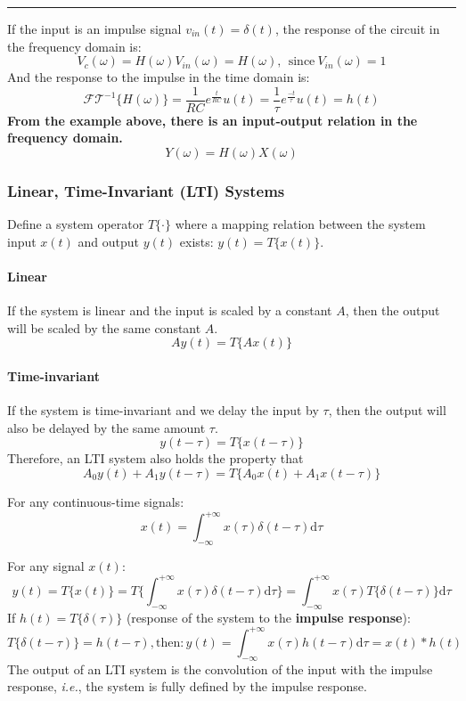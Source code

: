\begin{ex}{}
\vspace{0.5cm}
\hrule
\vspace{0.5cm}

If the input is an impulse signal $v_{in}(t) = \delta(t)$, the response of the circuit in the frequency domain is:
\[ 
V_{c}(\omega)  = H(\omega)V_{in}(\omega) = H(\omega), \ \ \text{since} \ V_{in}(\omega)=1
\]
And the response to the impulse in the time domain is:
\[ 
\mathcal{FT}^{-1}\{ H(\omega) \} = \frac{1}{RC} e^{\frac{t}{RC}} u(t) = \frac{1}{\tau} e^{\frac{-t}{\tau}} u(t) = h(t) 
\]
\textbf{From the example above, there is an input-output relation in the frequency domain.}
\[ 
Y(\omega) =  H(\omega)  X(\omega) 
\]
\end{ex}

\subsubsection{Linear, Time-Invariant (LTI) Systems}
\begin{tcolorbox}[title = Definition of LTI systems]
Define a system operator $T\{ \cdot \}$ where a mapping relation between the system input $x(t)$ and output $y(t)$ exists: $y(t) = T\{x(t)\}$.

\paragraph{Linear} If the system is linear and the input is scaled by a constant $A$, then the output will be scaled by the same constant $A$.
\[
    Ay(t) = T\{ Ax(t) \}
\]
\paragraph{Time-invariant} If the system is time-invariant and we delay the input by $\tau$, then the output will also be delayed by the same amount $\tau$. 
\[
     y(t-\tau) = T\{ x(t-\tau) \}
\]
Therefore, an LTI system also holds the property that
\[
    A_0 y(t) + A_1 y(t-\tau) = T\{ A_0 x(t) + A_1 x(t-\tau) \}
\]
\end{tcolorbox}

For any continuous-time signals:
\[ x(t) = \int_{-\infty}^{+\infty} x(\tau) \delta(t-\tau)\mathrm{d}\tau \]

For any signal $x(t)$:
\[ 
    y(t) = T\{x(t)\} = T \bigg\{ \int_{-\infty}^{+\infty} x(\tau)\delta(t-\tau) \mathrm{d}\tau \bigg\} = \int_{-\infty}^{+\infty} x(\tau)T\bigg\{\delta(t-\tau) \bigg\} \mathrm{d}\tau 
\]
If  $h(t) = T\{\delta(\tau)\} $ (response of the system to the \textbf{impulse response}):
\[ 
    T\{\delta(t-\tau)\} = h(t-\tau), \text{then}: y(t) = \int_{-\infty}^{+\infty} x(\tau)h(t-\tau)\mathrm{d}\tau = x(t)*h(t) 
\]
The output of an LTI system is the convolution of the input with the impulse response, \textit{i.e.}, the system is fully defined by the impulse response. \\

